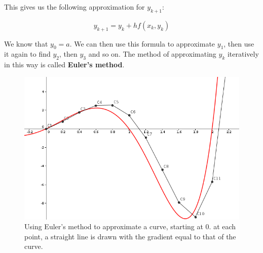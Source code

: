 This gives us the following approximation for $y_{k+1}$:

\[y_{k+1}=y_k + hf(x_k,y_k)\]

We know that $y_0=a$. We can then use this formula to approximate $y_1$, then use it again to find $y_2$, then $y_3$ and so on.
The method of approximating $y_k$ iteratively in this way is called \textbf{Euler's method}.

\begin{figure}[H]
\centering
\includegraphics[width=.8\textwidth]{img/eulermethod2}
\caption{Using Euler's method to approximate a curve, starting at 0. at each point, a straight line is drawn with the gradient equal to that of the curve.}
\end{figure}

